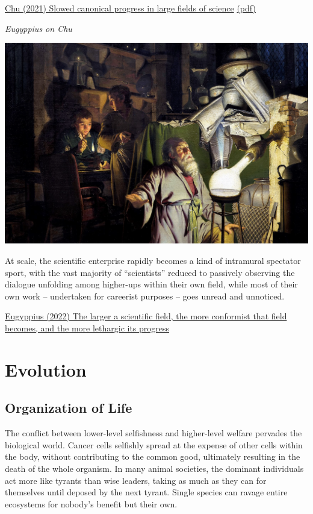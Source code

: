 \documentclass[
]{book}
\begin{document}
\href{https://www.pnas.org/doi/10.1073/pnas.2021636118}{Chu (2021) Slowed canonical progress in large fields of science}
\href{pdf/Chu_2021_Slowed_Scientific_Progress.pdf}{(pdf)}

\emph{Eugyppius on Chu}

\includegraphics{fig/science.png}

At scale, the scientific enterprise rapidly becomes a kind of intramural spectator sport, with the vast majority of ``scientists'' reduced to passively observing the dialogue unfolding among higher-ups within their own field, while most of their own work -- undertaken for careerist purposes -- goes unread and unnoticed.

\href{https://www.eugyppius.com/p/study-the-larger-a-scientific-field}{Eugyppius (2022) The larger a scientific field, the more conformist that field becomes, and the more lethargic its progress}

\hypertarget{evolution}{%
\chapter{Evolution}\label{evolution}}

\hypertarget{organization-of-life}{%
\section{Organization of Life}\label{organization-of-life}}

The conflict between lower-level selfishness and higher-level welfare pervades the biological world. Cancer cells selfishly spread at the expense of other cells within the body, without contributing to the common good, ultimately resulting in the death of the whole organism. In many animal societies, the dominant individuals act more like tyrants than wise leaders, taking as much as they can for themselves until deposed by the next tyrant. Single species can ravage entire ecosystems for nobody's benefit but their own.
\end{document}
